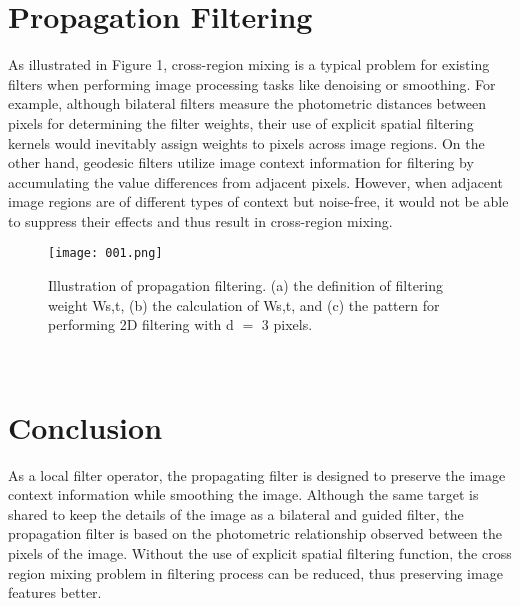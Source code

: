 \documentclass[30pt,twocolumn,letterpaper]{article}
\begin{document}
\section{Propagation Filtering}
As illustrated in Figure 1, cross-region mixing is a typical problem for existing filters when performing image processing tasks like denoising or smoothing. For example, although bilateral filters measure the photometric distances between pixels for determining the filter weights, their use of explicit spatial filtering kernels would inevitably assign weights to pixels across image regions\cite{Mclaughlin2001Theory}. On the other hand, geodesic filters utilize image context information for filtering by accumulating the value differences from adjacent pixels. However, when adjacent image regions are of different types of context but noise-free, it would not be able to suppress their effects and thus result in cross-region mixing\cite{Ntziachristos2010Going}.\\
\begin{figure}[htbp]
\small
\centering
\texttt{[image: 001.png]}
\caption{Illustration of propagation filtering. (a) the definition of
filtering weight Ws,t, (b) the calculation of Ws,t, and (c) the pattern
for performing 2D filtering with d $=$ 3 pixels.
}
\label{fig:lable}
\end{figure}\\
\section{Conclusion}
As a local filter operator, the propagating filter is designed to preserve the image context information while smoothing the image\cite{Ruaux2013Enteroscopy}. Although the same target is shared to keep the details of the image as a bilateral and guided filter, the propagation filter is based on the photometric relationship observed between the pixels of the image. Without the use of explicit spatial filtering function, the cross region mixing problem in filtering process can be reduced, thus preserving image features better.
{\small


}
\end{document}

